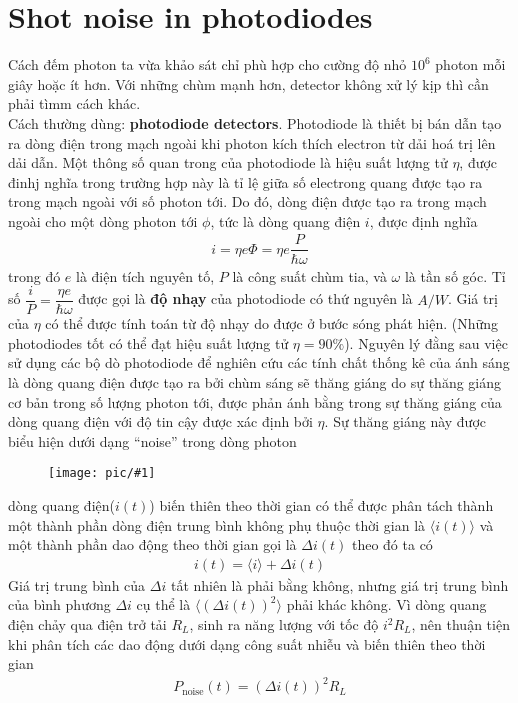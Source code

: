 \documentclass{report}
\newcommand{\image}[1]{
\begin{figure}[H]
	\centering
	\texttt{[image: pic/\#1]}
	\label{#1}
\end{figure}
}
\newcommand{\q}[1]{``#1''}
\newcommand{\mean}[1]{\langle{#1}\rangle}
\newcommand{\f}[2]{\dfrac{#1}{#2}}
\begin{document}
\section{Shot noise in photodiodes}
Cách đếm photon ta vừa khảo sát chỉ phù hợp cho cường độ nhỏ $10^{6}$ photon mỗi giây hoặc ít hơn. Với những chùm mạnh hơn, detector không xử lý kịp thì cần phải tìmm cách khác.\\
Cách thường dùng: \textbf{photodiode detectors}. Photodiode là thiết bị bán dẫn tạo ra dòng điện trong mạch ngoài khi photon kích thích electron từ dải hoá trị lên dải dẫn. Một thông số quan trong của photodiode là hiệu suất lượng tử $\eta$, được đinhj nghĩa trong trường hợp này là tỉ lệ giữa số electrong quang được tạo ra trong mạch ngoài với số photon tới. Do đó, dòng điện được tạo ra trong mạch ngoài cho một dòng photon tới $\phi$, tức là dòng quang điện $i$, được định nghĩa
\begin{gather}
	i = \eta e \Phi = \eta e \f{P}{\hbar \omega}
\end{gather}
trong đó $e$ là điện tích nguyên tố, $P$ là công suất chùm tia, và $\omega$ là tần số góc. Tỉ số $\f{i}{P} = \f{\eta e}{\hbar \omega}$ được gọi là \textbf{độ nhạy} của photodiode có thứ nguyên là $A/W$. Giá trị của $\eta$ có thể được tính toán từ độ nhạy do được ở bước sóng phát hiện. (Những photodiodes tốt có thể đạt hiệu suất lượng tử $\eta = 90\%$). Nguyên lý đằng sau việc sử dụng các bộ dò photodiode để nghiên cứu các tính chất thống kê của ánh sáng là dòng quang điện được tạo ra bởi chùm sáng sẽ thăng giáng do sự thăng giáng cơ bản trong số lượng photon tới, được phản ánh bằng trong sự thăng giáng của dòng quang điện với độ tin cậy được xác định bởi $\eta$. Sự thăng giáng này được biểu hiện dưới dạng \q{noise} trong dòng photon
\image{noise.png}
dòng quang điện($i(t)$) biến thiên theo thời gian có thể được phân tách thành một thành phần dòng điện trung bình không phụ thuộc thời gian là $\mean{i(t)}$ và một thành phần dao động theo thời gian gọi là $\Delta i(t)$ theo đó ta có 
\begin{gather}
	i(t) = \mean{i} + \Delta i(t)
\end{gather}
Giá trị trung bình của $\Delta i$ tất nhiên là phải bằng không, nhưng giá trị trung bình của bình phương $\Delta i$ cụ thể là $\mean{\left(\Delta i (t)\right)^{2}}$ phải khác không. Vì dòng quang điện chảy qua điện trở tải $R_{L}$, sinh ra năng lượng với tốc độ $i^{2} R_{L}$, nên thuận tiện khi phân tích các dao động dưới dạng công suất nhiễu và biến thiên theo thời gian
\begin{gather}
	P_{\text{noise}}(t) = (\Delta i(t))^{2} R_{L}
\end{gather} 
\end{document}
